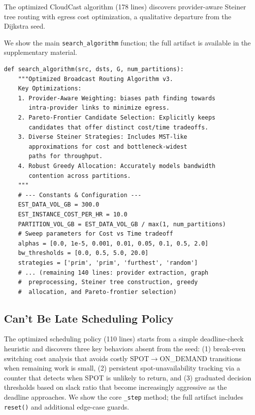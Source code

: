 \documentclass[sigconf,anonymous,review]{acmart}
\begin{document}
The optimized CloudCast algorithm (178 lines) discovers provider-aware Steiner tree routing with egress cost optimization, a qualitative departure from the Dijkstra seed. 

We show the main \texttt{search\_algorithm} function; the full artifact is available in the supplementary material.

\begin{promptbox}
\begin{lstlisting}[aboveskip=0pt,belowskip=0pt,numbers=none,frame=none,backgroundcolor=\color{gray!5}]
def search_algorithm(src, dsts, G, num_partitions):
    """Optimized Broadcast Routing Algorithm v3.
    Key Optimizations:
    1. Provider-Aware Weighting: biases path finding towards
       intra-provider links to minimize egress.
    2. Pareto-Frontier Candidate Selection: Explicitly keeps
       candidates that offer distinct cost/time tradeoffs.
    3. Diverse Steiner Strategies: Includes MST-like
       approximations for cost and bottleneck-widest
       paths for throughput.
    4. Robust Greedy Allocation: Accurately models bandwidth
       contention across partitions.
    """
    # --- Constants & Configuration ---
    EST_DATA_VOL_GB = 300.0
    EST_INSTANCE_COST_PER_HR = 10.0
    PARTITION_VOL_GB = EST_DATA_VOL_GB / max(1, num_partitions)
    # Sweep parameters for Cost vs Time tradeoff
    alphas = [0.0, 1e-5, 0.001, 0.01, 0.05, 0.1, 0.5, 2.0]
    bw_thresholds = [0.0, 0.5, 5.0, 20.0]
    strategies = ['prim', 'prim', 'furthest', 'random']
    # ... (remaining 140 lines: provider extraction, graph
    #  preprocessing, Steiner tree construction, greedy
    #  allocation, and Pareto-frontier selection)
\end{lstlisting}
\end{promptbox}

\subsection{Can't Be Late Scheduling Policy}
\label{app:sol-cantbelate}

The optimized scheduling policy (110 lines) starts from a simple deadline-check heuristic and discovers three key behaviors absent from the seed: (1) break-even switching cost analysis that avoids costly SPOT$\to$ON\_DEMAND transitions when remaining work is small, (2) persistent spot-unavailability tracking via a counter that detects when SPOT is unlikely to return, and (3) graduated decision thresholds based on slack ratio that become increasingly aggressive as the deadline approaches. We show the core \texttt{\_step} method; the full artifact includes \texttt{reset()} and additional edge-case guards.
\end{document}
